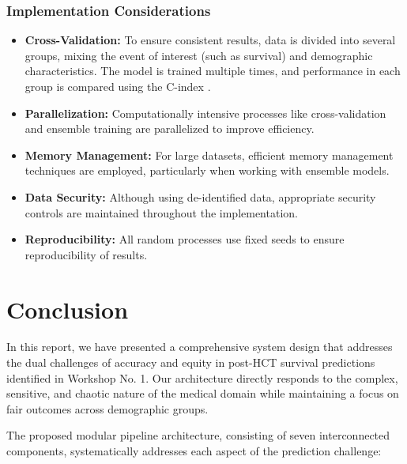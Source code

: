 \subsubsection{Implementation Considerations}

\begin{itemize}
    \item \textbf{Cross-Validation:} To ensure consistent results, data is divided into several groups, mixing the event of interest (such as survival) and demographic characteristics. The model is trained multiple times, and performance in each group is compared using the C-index \cite{scikit_learn_cv}.
    
    \item \textbf{Parallelization:} Computationally intensive processes like cross-validation and ensemble training are parallelized to improve efficiency.
    
    \item \textbf{Memory Management:} For large datasets, efficient memory management techniques are employed, particularly when working with ensemble models.
    
    \item \textbf{Data Security:} Although using de-identified data, appropriate security controls are maintained throughout the implementation.
    
    \item \textbf{Reproducibility:} All random processes use fixed seeds to ensure reproducibility of results.
\end{itemize}

\section{Conclusion}

In this report, we have presented a comprehensive system design that addresses the dual challenges of accuracy and equity in post-HCT survival predictions identified in Workshop No. 1. Our architecture directly responds to the complex, sensitive, and chaotic nature of the medical domain while maintaining a focus on fair outcomes across demographic groups.

The proposed modular pipeline architecture, consisting of seven interconnected components, systematically addresses each aspect of the prediction challenge:

